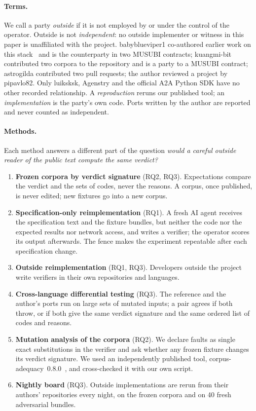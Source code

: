 \documentclass[11pt,a4paper]{article}
\begin{document}
\paragraph{Terms.} We call a party \emph{outside} if it is not employed by or under the control of the operator. Outside is not \emph{independent}: no outside implementer or witness in this paper is unaffiliated with the project. babyblueviper1 co-authored earlier work on this stack~\citep{ssrn7419998} and is the counterparty in two MUSUBI contracts; kuangmi-bit contributed two corpora to the repository and is a party to a MUSUBI contract; astrogilda contributed two pull requests; the author reviewed a project by pipavlo82. Only luiksksk, Agenstry and the official A2A Python SDK have no other recorded relationship. A \emph{reproduction} reruns our published tool; an \emph{implementation} is the party's own code. Ports written by the author are reported and never counted as independent.

\paragraph{Methods.} Each method answers a different part of the question \emph{would a careful outside reader of the public text compute the same verdict?}
\begin{enumerate}[label=M\arabic*.]
\item \textbf{Frozen corpora by verdict signature} (RQ2, RQ3). Expectations compare the verdict and the sets of codes, never the reasons. A corpus, once published, is never edited; new fixtures go into a new corpus.
\item \textbf{Specification-only reimplementation} (RQ1). A fresh AI agent receives the specification text and the fixture bundles, but neither the code nor the expected results nor network access, and writes a verifier; the operator scores its output afterwards. The fence makes the experiment repeatable after each specification change.
\item \textbf{Outside reimplementation} (RQ1, RQ3). Developers outside the project write verifiers in their own repositories and languages.
\item \textbf{Cross-language differential testing} (RQ3). The reference and the author's ports run on large sets of mutated inputs; a pair agrees if both throw, or if both give the same verdict signature and the same ordered list of codes and reasons.
\item \textbf{Mutation analysis of the corpora} (RQ2). We declare faults as single exact substitutions in the verifier and ask whether any frozen fixture changes its verdict signature. We used an independently published tool, corpus-adequacy~0.8.0~\citep{corpusadequacy}, and cross-checked it with our own script.
\item \textbf{Nightly board} (RQ3). Outside implementations are rerun from their authors' repositories every night, on the frozen corpora and on 40 fresh adversarial bundles.
\end{enumerate}
\end{document}
